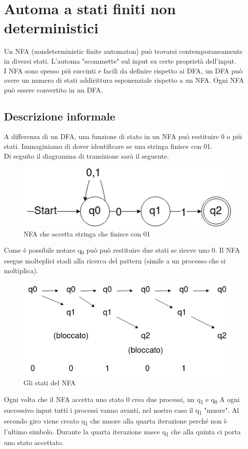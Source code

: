 \documentclass[12pt]{article}
\begin{document}
\section{Automa a stati finiti non deterministici}
Un NFA (nondeterministic finite automaton) può trovarsi contemporaneamente in diversi stati. L'automa "scommette" sul input su certe proprietà dell'input.
\\ I NFA sono spesso più succinti e facili da definire rispetto ai DFA, un DFA può avere un numero di stati addirittura esponenziale rispetto a un NFA. Ogni NFA può essere convertito in un DFA.

\newpage
\subsection{Descrizione informale}
A differenza di un DFA, una funzione di stato in un NFA può restituire 0 o più stati. Immaginiamo di dover identificare se una stringa finisce con 01.
\\ Di seguito il diagramma di transizione sarà il seguente.
\begin{figure}[ht]
	\includegraphics[scale = 0.5]{media/01_end.png}
	\centering
	\caption{NFA che accetta stringa che finisce con 01}
\end{figure}
Come è possibile notare q\textsubscript{0} può può restituire due stati se riceve uno 0. Il NFA esegue molteplici stadi alla ricerca del pattern (simile a un processo che si moltiplica).

\begin{figure}[ht]
	\includegraphics[scale = 0.5]{media/NFA_es.png}
	\centering
	\caption{Gli stati del NFA}
\end{figure}
Ogni volta che il NFA accetta uno stato 0 crea due processi, un q\textsubscript{1} e q\textsubscript{0}
A ogni successivo input tutti i processi vanno avanti, nel nostro caso il q\textsubscript{1} "muore". Al secondo giro viene creato q\textsubscript{1} che muore alla quarta iterazione perché non è l'ultimo simbolo. Durante la quarta iterazione nasce q\textsubscript{1} che alla quinta ci porta uno stato accettato.
\end{document}
